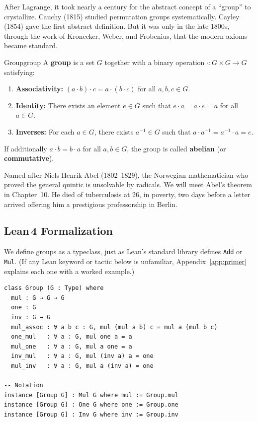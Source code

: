 \documentclass[11pt, a4paper, oneside]{book}
\newcommand{\lc}[1]{\texttt{#1}}
\begin{document}
After Lagrange, it took nearly a century for the abstract concept of a
``group'' to crystallize. Cauchy (1815) studied permutation groups
systematically. Cayley (1854) gave the first abstract definition. But it was
only in the late 1800s, through the work of Kronecker, Weber, and Frobenius,
that the modern axioms became standard.

\begin{defn}{Group}{group}
A \textbf{group} is a set $G$ together with a binary operation
$\cdot : G \times G \to G$ satisfying:
\begin{enumerate}[nosep, label=(\roman*)]
\item \textbf{Associativity:}
  $(a \cdot b) \cdot c = a \cdot (b \cdot c)$ for all $a, b, c \in G$.
\item \textbf{Identity:} There exists an element $e \in G$ such that
  $e \cdot a = a \cdot e = a$ for all $a \in G$.
\item \textbf{Inverses:} For each $a \in G$, there exists $a^{-1} \in G$
  such that $a \cdot a^{-1} = a^{-1} \cdot a = e$.
\end{enumerate}
If additionally $a \cdot b = b \cdot a$ for all $a, b \in G$, the group is
called \textbf{abelian} (or \textbf{commutative}).
\end{defn}

\begin{historical}[title={Why ``abelian''?}]
Named after Niels Henrik Abel (1802--1829), the Norwegian mathematician who
proved the general quintic is unsolvable by radicals. We will meet Abel's
theorem in Chapter~10. He died of tuberculosis at 26, in poverty, two days
before a letter arrived offering him a prestigious professorship in Berlin.
\end{historical}

\subsection{Lean\,4 Formalization}

We define groups as a typeclass, just as Lean's standard library defines
\lc{Add} or \lc{Mul}. (If any Lean keyword or tactic below is unfamiliar,
Appendix~\ref{app:primer} explains each one with a worked example.)

\begin{leanbox}
\begin{verbatim}
class Group (G : Type) where
  mul : G → G → G
  one : G
  inv : G → G
  mul_assoc : ∀ a b c : G, mul (mul a b) c = mul a (mul b c)
  one_mul   : ∀ a : G, mul one a = a
  mul_one   : ∀ a : G, mul a one = a
  inv_mul   : ∀ a : G, mul (inv a) a = one
  mul_inv   : ∀ a : G, mul a (inv a) = one

-- Notation
instance [Group G] : Mul G where mul := Group.mul
instance [Group G] : One G where one := Group.one
instance [Group G] : Inv G where inv := Group.inv
\end{verbatim}
\end{leanbox}
\end{document}
